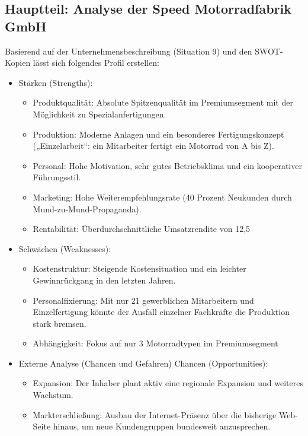 \documentclass[12pt, a4paper]{article}
\begin{document}
\subsection{Hauptteil: Analyse der Speed Motorradfabrik GmbH}
Basierend auf der Unternehmensbeschreibung (Situation 9) und den SWOT-Kopien lässt sich folgendes Profil erstellen:
\begin{itemize}
    \item Stärken (Strengths):
        \begin{itemize}
            \item Produktqualität: Absolute Spitzenqualität im Premiumsegment mit der Möglichkeit zu Spezialanfertigungen.
            \item Produktion: Moderne Anlagen und ein besonderes Fertigungskonzept („Einzelarbeit“: ein Mitarbeiter fertigt ein Motorrad von A bis Z).
            \item Personal: Hohe Motivation, sehr gutes Betriebsklima und ein kooperativer Führungsstil.
            \item Marketing: Hohe Weiterempfehlungsrate (40 Prozent Neukunden durch Mund-zu-Mund-Propaganda).
            \item Rentabilität: Überdurchschnittliche Umsatzrendite von 12,5 %
        \end{itemize}
    \item Schwächen (Weaknesses):
        \begin{itemize}
            \item Kostenstruktur: Steigende Kostensituation und ein leichter Gewinnrückgang in den letzten Jahren.
            \item Personalfixierung: Mit nur 21 gewerblichen Mitarbeitern und Einzelfertigung könnte der Ausfall einzelner Fachkräfte die Produktion stark bremsen.
            \item Abhängigkeit: Fokus auf nur 3 Motorradtypen im Premiumsegment
        \end{itemize}
    \item Externe Analyse (Chancen und Gefahren)
        Chancen (Opportunities):
        \begin{itemize}
            \item Expansion: Der Inhaber plant aktiv eine regionale Expansion und weiteres Wachstum.
            \item Markterschließung: Ausbau der Internet-Präsenz über die bisherige Web-Seite hinaus, um neue Kundengruppen bundesweit anzusprechen.
        \end{itemize}

\end{itemize}
\end{document}
